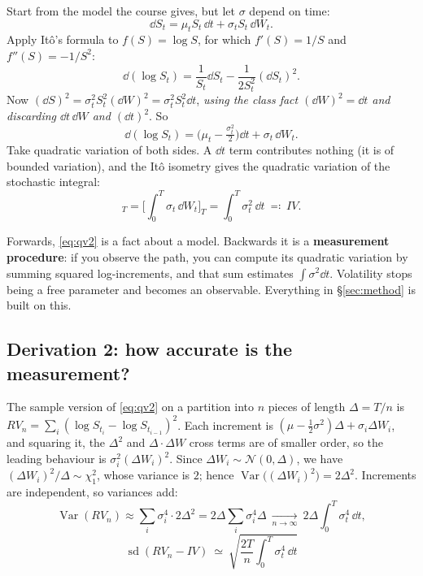 \documentclass[11pt,a4paper]{article}
\begin{document}
Start from the model the course gives, but let $\sigma$ depend on time:
\begin{equation}
\dd S_t=\mu_t S_t\,\dd t+\sigma_t S_t\,\dd W_t .
\label{eq:sde2}
\end{equation}
Apply It\^o's formula to $f(S)=\log S$, for which $f'(S)=1/S$ and $f''(S)=-1/S^2$:
\[
\dd(\log S_t)=\frac{1}{S_t}\dd S_t-\frac{1}{2S_t^2}(\dd S_t)^2 .
\]
Now $(\dd S)^2=\sigma_t^2S_t^2(\dd W)^2=\sigma_t^2S_t^2\dd t$, \emph{using the class fact
$(\dd W)^2=\dd t$ and discarding $\dd t\,\dd W$ and $(\dd t)^2$}. So
\[
\dd(\log S_t)=\Big(\mu_t-\tfrac{\sigma_t^2}{2}\Big)\dd t+\sigma_t\,\dd W_t .
\]
Take quadratic variation of both sides. A $\dd t$ term contributes nothing (it is of bounded
variation), and the It\^o isometry gives the quadratic variation of the stochastic integral:
\begin{equation}
[\log S]_T=\Big[\int_0^T\sigma_t\,\dd W_t\Big]_T=\int_0^T\sigma_t^2\,\dd t\ \eqqcolon\ IV .
\label{eq:qv2}
\end{equation}

\begin{whybox}
Forwards, \eqref{eq:qv2} is a fact about a model. Backwards it is a \textbf{measurement
procedure}: if you observe the path, you can compute its quadratic variation by summing squared
log-increments, and that sum estimates $\int\sigma^2\dd t$. Volatility stops being a free
parameter and becomes an observable. Everything in \S\ref{sec:method} is built on this.
\end{whybox}

\subsection{Derivation 2: how accurate is the measurement?}

The sample version of \eqref{eq:qv2} on a partition into $n$ pieces of length $\Delta=T/n$ is
$RV_n=\sum_{i}(\log S_{t_i}-\log S_{t_{i-1}})^2$. Each increment is
$(\mu-\tfrac12\sigma^2)\Delta+\sigma_i\Delta W_i$, and squaring it, the $\Delta^2$ and
$\Delta\cdot\Delta W$ cross terms are of smaller order, so the leading behaviour is
$\sigma_i^2(\Delta W_i)^2$. Since $\Delta W_i\sim\mathcal{N}(0,\Delta)$, we have
$(\Delta W_i)^2/\Delta\sim\chi^2_1$, whose variance is $2$; hence
$\operatorname{Var}\big((\Delta W_i)^2\big)=2\Delta^2$. Increments are independent, so variances
add:
\[
\operatorname{Var}(RV_n)\approx\sum_i\sigma_i^4\cdot2\Delta^2
=2\Delta\sum_i\sigma_i^4\Delta\ \xrightarrow[n\to\infty]{}\ 2\Delta\int_0^T\sigma_t^4\,\dd t,
\]
\begin{equation}
\boxed{\ \operatorname{sd}(RV_n-IV)\ \simeq\ \sqrt{\frac{2T}{n}\int_0^T\sigma_t^4\,\dd t}\ }
\label{eq:rvse2}
\end{equation}
\end{document}
